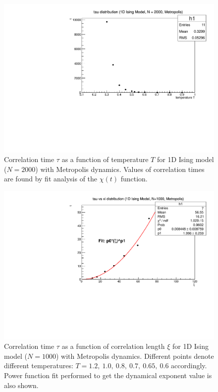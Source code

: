 \documentclass[11pt,a4paper]{article}%
\begin{document}
\begin{figure}[!ht]
\centering
  \includegraphics[scale=0.6]{IsingTestTCorr_T_vs_tau.pdf}
  \vspace{-0.05in}
   \caption[]{Correlation time $\tau$ as a function of temperature $T$ for 1D Ising model ($N=2000$) with Metropolis dynamics. Values of correlation times are found by fit analysis of the $\chi(t)$ function.}   
  \label{T_vs_tau_1d}
\end{figure}

\begin{figure}[!ht]
\centering
  \includegraphics[scale=0.6]{tau_vs_xi.pdf}
  \vspace{-0.05in}
   \caption[]{Correlation time $\tau$ as a function of correlation length $\xi$ for 1D Ising model ($N=1000$) with Metropolis dynamics. Different points denote different temperatures: $T=1.2,~1.0,~0.8,~0.7, ~0.65,~0.6$ accordingly. Power function fit performed to get the dynamical exponent value is also shown.}   
  \label{tau_vs_xi_1d}
\end{figure}
 
\end{document}
